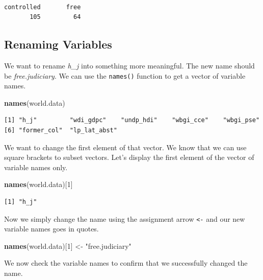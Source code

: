 \documentclass[]{book}
\newenvironment{Shaded}{\begin{snugshade}}{\end{snugshade}}
\newcommand{\KeywordTok}[1]{\textcolor[rgb]{0.13,0.29,0.53}{\textbf{#1}}}
\newcommand{\DecValTok}[1]{\textcolor[rgb]{0.00,0.00,0.81}{#1}}
\newcommand{\StringTok}[1]{\textcolor[rgb]{0.31,0.60,0.02}{#1}}
\newcommand{\NormalTok}[1]{#1}
\theoremstyle{definition}
\theoremstyle{definition}
\theoremstyle{definition}
\theoremstyle{remark}
\begin{document}
\begin{verbatim}

controlled       free 
       105         64 
\end{verbatim}

\subsection{Renaming Variables}\label{renaming-variables}

We want to rename \emph{h\_j} into something more meaningful. The new
name should be \emph{free.judiciary}. We can use the \texttt{names()}
function to get a vector of variable names.

\begin{Shaded}
\begin{Highlighting}[]
\KeywordTok{names}\NormalTok{(world.data)}
\end{Highlighting}
\end{Shaded}

\begin{verbatim}
[1] "h_j"         "wdi_gdpc"    "undp_hdi"    "wbgi_cce"    "wbgi_pse"   
[6] "former_col"  "lp_lat_abst"
\end{verbatim}

We want to change the first element of that vector. We know that we can
use square brackets to subset vectors. Let's display the first element
of the vector of variable names only.

\begin{Shaded}
\begin{Highlighting}[]
\KeywordTok{names}\NormalTok{(world.data)[}\DecValTok{1}\NormalTok{]}
\end{Highlighting}
\end{Shaded}

\begin{verbatim}
[1] "h_j"
\end{verbatim}

Now we simply change the name using the assignment arrow
\texttt{\textless{}-} and our new variable names goes in quotes.

\begin{Shaded}
\begin{Highlighting}[]
\KeywordTok{names}\NormalTok{(world.data)[}\DecValTok{1}\NormalTok{] <-}\StringTok{ "free.judiciary"}
\end{Highlighting}
\end{Shaded}

We now check the variable names to confirm that we successfully changed
the name.
\end{document}

